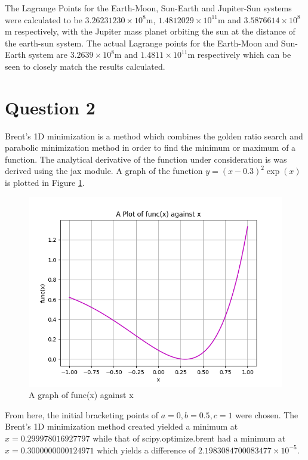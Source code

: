 \documentclass[11pt]{article}
\begin{document}
The Lagrange Points for the Earth-Moon, Sun-Earth and Jupiter-Sun systems were calculated to be $3.26231230 \times 10^{8}$m, $1.4812029 \times 10^{11}$m and $3.5876614 \times 10^{8}$m respectively, with the Jupiter mass planet orbiting the sun at the distance of the earth-sun system. The actual Lagrange points for the Earth-Moon and Sun-Earth system are $3.2639\times 10^8$m and $1.4811\times10^{11}$m respectively which can be seen to closely match the results calculated.

\section{Question 2}
 Brent's 1D minimization is a method which combines the golden ratio search and parabolic minimization method in order to find the minimum or maximum of a function. The analytical derivative of the function under consideration is was derived using the jax module. A graph of the function $y = (x-0.3)^{2}\exp(x)$ is plotted in Figure \ref{fig:brent}.
  
 \begin{figure}[!h]
 	
 	\centering
 	\includegraphics[width=0.83\linewidth]{brent.png}
 	\caption{A graph of func(x) against x}
 	\label{fig:brent}
 	
 \end{figure}
 
 From here, the initial bracketing points of $a=0, b=0.5, c=1$ were chosen.
 The Brent's 1D minimization method created yielded a minimum at $x = 0.299978016927797$ while that of scipy.optimize.brent had a minimum at $x = 0.3000000000124971$ which yields a difference of $2.1983084700083477\times 10^{-5}$.
 
 \cleardoublepage
 \renewcommand\bibname{References}
 
 
 
\end{document}

